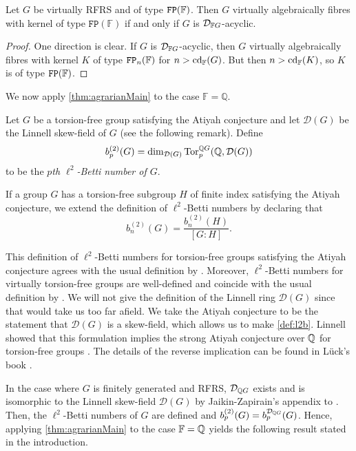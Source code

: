 \documentclass[11pt, letterpaper]{amsart}
\begin{document}
\begin{cor}\label{cor:typeFP}
    Let $G$ be virtually RFRS and of type $\mathtt{FP}(\mathbb{F})$. Then $G$ virtually algebraically fibres with kernel of type $\mathtt{FP}(\mathbb F)$ if and only if $G$ is $\mathcal{D}_{\mathbb F{G}}$-acyclic.
\end{cor}

\begin{proof}
    One direction is clear. If $G$ is $\mathcal{D}_{\mathbb F{G}}$-acyclic, then $G$ virtually algebraically fibres with kernel $K$ of type $\mathtt{FP}_n(\mathbb F)$ for $n > \operatorname{cd}_\mathbb F(G)$. But then $n > \operatorname{cd}_\mathbb F (K)$, so $K$ is of type $\mathtt{FP}(\mathbb F)$. \qedhere
\end{proof}

We now apply \cref{thm:agrarianMain} to the case $\mathbb{F} = \mathbb{Q}$.

\begin{defn} \label{def:l2b}
Let $G$ be a torsion-free group satisfying the Atiyah conjecture and let $\mathcal{D}(G)$ be the Linnell skew-field of $G$ (see the following remark). Define
\[
    b_p^{(2)}(G) = \dim_{\mathcal{D}(G)} \operatorname{Tor}_p^{\mathbb{Q} G} (\mathbb{Q}, \mathcal{D}(G))
\]
to be the \textit{$p$th $\ell^2$-Betti number of $G$}.

If a group $G$ has a torsion-free subgroup $H$ of finite index satisfying the Atiyah conjecture, we extend the definition of $\ell^2$-Betti numbers by declaring that
\[
    b_n^{(2)}(G) = \frac{b_n^{(2)}(H)}{[G:H]}.
\]
\end{defn}

\begin{rem}
This definition of $\ell^2$-Betti numbers for torsion-free groups satisfying the Atiyah conjecture agrees with the usual definition by \cite[Lemma 10.28(3)]{Luck02}. Moreover, $\ell^2$-Betti numbers for virtually torsion-free groups are well-defined and coincide with the usual definition by \cite[Theorem 6.54(6)]{Luck02}. We will not give the definition of the Linnell ring $\mathcal{D}(G)$ since that would take us too far afield. We take the Atiyah conjecture to be the statement that $\mathcal{D}(G)$ is a skew-field, which allows us to make \cref{def:l2b}. Linnell showed that this formulation implies the strong Atiyah conjecture over $\mathbb{Q}$ for torsion-free groups \cite{LinnellDivRings93}. The details of the reverse implication can be found in L\"uck's book \cite[Section 10]{Luck02}.
\end{rem}

In the case where $G$ is finitely generated and RFRS, $\mathcal{D}_{\mathbb{Q} G}$ exists and is isomorphic to the Linnell skew-field $\mathcal{D}(G)$ by Jaikin-Zapirain's appendix to \cite{JaikinZapirain2020THEUO}. Then, the $\ell^2$-Betti numbers of $G$ are defined and $b_p^{(2)}(G) = b_p^{\mathcal{D}_{\mathbb{Q} G}}(G)$. Hence, applying \cref{thm:agrarianMain} to the case $\mathbb{F} = \mathbb{Q}$ yields the following result stated in the introduction.
\end{document}

